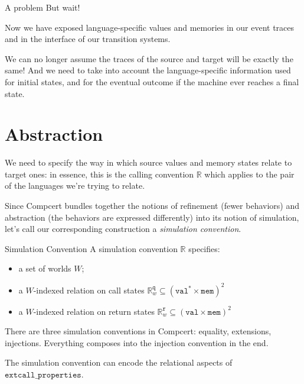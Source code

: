 \documentclass[handout]{beamer}
\newcommand{\kw}[1]{\texttt{#1}}
\begin{document}
\begin{frame}{A problem} %
But wait!

Now we have exposed language-specific values and memories
in our event traces and
in the interface of our transition systems.

We can no longer assume the traces of the source and target
will be exactly the same!
And we need to take into account the language-specific information
used for initial states,
and for the eventual outcome
if the machine ever reaches a final state.
\end{frame}

\section{Abstraction}

\begin{frame} %
We need to specify the way in which source values and memory states
relate to target ones:
in essence,
this is the calling convention $\mathbb{R}$
which applies to the pair
of the languages we're trying to relate.

Since Compcert bundles together the notions of
refinement (fewer behaviors) and
abstraction (the behaviors are expressed differently)
into its notion of simulation,
let's call our corresponding construction a
\emph{simulation convention}.
\end{frame}

\begin{frame}{Simulation Convention} %
A simulation convention $\mathbb{R}$ specifies:
\begin{itemize}
  \item a set of worlds $W$;
  \item a $W$-indexed relation on call states
    $\mathbb{R}^\kw{q}_w \subseteq (\kw{val}^* \times \kw{mem})^2$
  \item a $W$-indexed relation on return states
    $\mathbb{R}^\kw{r}_w \subseteq (\kw{val} \times \kw{mem})^2$
\end{itemize}
There are three simulation conventions in Compcert:
equality, extensions, injections.
Everything composes into the injection convention in the end.

The simulation convention can encode the relational aspects
of $\kw{extcall\_properties}$.
\end{frame}
\end{document}
